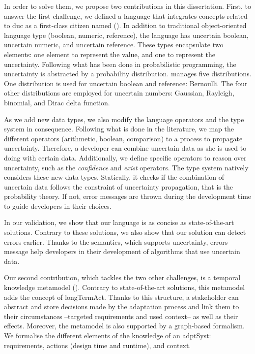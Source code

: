 In order to solve them, we propose two contributions in this dissertation.
First, to answer the first challenge, we defined a language that integrates concepts related to \gls{duc} as a first-class citizen named \langName{} (\cf {}).
In addition to traditional object-oriented language type (boolean, numeric, reference), the language has uncertain boolean, uncertain numeric, and uncertain reference.
These types encapsulate two elements: one element to represent the value, and one to represent the uncertainty.
Following what has been done in probabilistic programming, the uncertainty is abstracted by a probability distribution.
\langName{} manages five distributions.
One distribution is used for uncertain boolean and reference: Bernoulli.
The four other distributions are employed for uncertain numbers: Gaussian, Rayleigh, binomial, and Dirac delta function.

As we add new data types, we also modify the language operators and the type system in consequence.
Following what is done in the literature, we map the different operators (arithmetic, boolean, comparison) to a process to propagate uncertainty.
Therefore, a developer can combine uncertain data as she is used to doing with certain data.
Additionally, we define specific operators to reason over uncertainty, such as the \textit{confidence} and \textit{exist} operators.
The type system natively considers these new data types.
Statically, it checks if the combination of uncertain data follows the constraint of uncertainty propagation, that is the probability theory.
If not, error messages are thrown during the development time to guide developers in their choices.

In our validation, we show that our language is as concise as state-of-the-art solutions.
Contrary to these solutions, we also show that our solution can detect errors earlier.
Thanks to the semantics, which supports uncertainty, errors message help developers in their development of algorithms that use uncertain data.

Our second contribution, which tackles the two other challenges, is a temporal knowledge \gls{metamodel} (\cf {}).
Contrary to state-of-the-art solutions, this \gls{metamodel} adds the concept of \gls{longTermAct}.
Thanks to this structure, a stakeholder can abstract and store decisions made by the adaptation process and link them to their circumstances --targeted requirements and used context-- as well as their effects. 
Moreover, the \gls{metamodel} is also supported by a graph-based formalism.
We formalise the different elements of the knowledge of an \gls{adptSyst}: \glspl{requirement}, \glspl{action} (design time and runtime), and \gls{context}.

